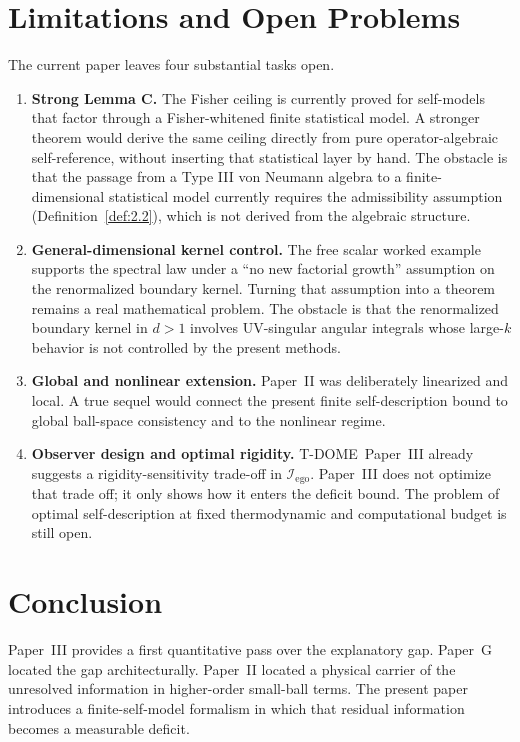 \documentclass[12pt]{article}
\theoremstyle{definition}
\theoremstyle{remark}
\begin{document}
\section{Limitations and Open Problems}\label{sec:7}

The current paper leaves four substantial tasks open.

\begin{enumerate}
\item \textbf{Strong Lemma C.} The Fisher ceiling is currently proved
for self-models that factor through a Fisher-whitened finite statistical
model. A stronger theorem would derive the same ceiling directly from
pure operator-algebraic self-reference, without inserting that
statistical layer by hand. The obstacle is that the passage from a Type
III von Neumann algebra to a finite-dimensional statistical model
currently requires the admissibility assumption
(Definition~\ref{def:2.2}), which is not derived from the algebraic
structure.

\item \textbf{General-dimensional kernel control.} The free scalar
worked example supports the spectral law under a ``no new factorial
growth'' assumption on the renormalized boundary kernel. Turning that
assumption into a theorem remains a real mathematical problem. The
obstacle is that the renormalized boundary kernel in \(d>1\) involves
UV-singular angular integrals whose large-\(k\) behavior is not
controlled by the present methods.

\item \textbf{Global and nonlinear extension.} Paper~II was deliberately
linearized and local. A true sequel would connect the present finite
self-description bound to global ball-space consistency and to the
nonlinear regime.

\item \textbf{Observer design and optimal rigidity.} T-DOME~Paper~III
already suggests a rigidity-sensitivity trade-off in
\(\mathcal{I}_{\mathrm{ego}}\). Paper~III does not optimize that trade
off; it only shows how it enters the deficit bound. The problem of
optimal self-description at fixed thermodynamic and computational budget
is still open.
\end{enumerate}

\section{Conclusion}\label{sec:8}

Paper~III provides a first quantitative pass over the explanatory
gap. Paper~G located the gap architecturally. Paper~II located a
physical carrier of the unresolved information in higher-order
small-ball terms. The present paper introduces a finite-self-model
formalism in which that residual information becomes a measurable
deficit.
\end{document}
